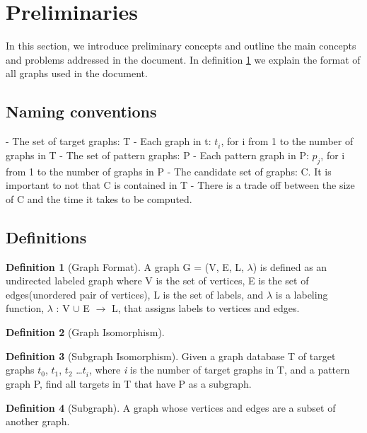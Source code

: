 \documentclass{l4proj}
\theoremstyle{definition}
\newtheorem{myDef}{Definition}
\begin{document}
        
\section{Preliminaries}
        In this section, we introduce preliminary concepts and outline the main concepts and problems addressed in the document. In definition \ref{def:graphFormat} we explain the format of all graphs used in the document.
        
    \subsection{Naming conventions}
    \label{naming}
    - The set of target graphs: T
    - Each graph in t: $t^{}_i$, for i from 1 to the number of graphs in T
    - The set of pattern graphs: P
    - Each pattern graph in P: $p^{}_j$, for i from 1 to the number of graphs in P
    - The candidate set of graphs: C. It is important to not that C is contained in T
    - There is a trade off between the size of C and the time it takes to be computed.
        
	\subsection{Definitions}
        \begin{myDef}[Graph Format]
        \label{def:graphFormat}
        A graph G = (V, E, L, $\lambda$) is defined as an undirected labeled graph where V is the set of vertices, E is the set of edges(unordered pair of vertices), L is the set of labels, and $\lambda$ is a labeling function, $\lambda$ : V $\cup$ E $\rightarrow$ L, that assigns labels to vertices and edges.
        \end{myDef}
        
        \begin{myDef}[Graph Isomorphism]
        
        \end{myDef}

        \begin{myDef}[Subgraph Isomorphism]
        \label{def:subgraphIsomorphism}
        Given a graph database T of target graphs $t^{}_0$, $t^{}_1$, $t^{}_2$ \ldots $t^{}_i$, where \textit{i} is the number of target graphs in T, and a pattern graph P, find all targets in T that have P as a subgraph.
        \end{myDef}
        
        \begin{myDef}[Subgraph]
        \label{def:subgraph}
        A graph whose vertices and edges are a subset of another graph.
        \end{myDef}
        
\end{document}
